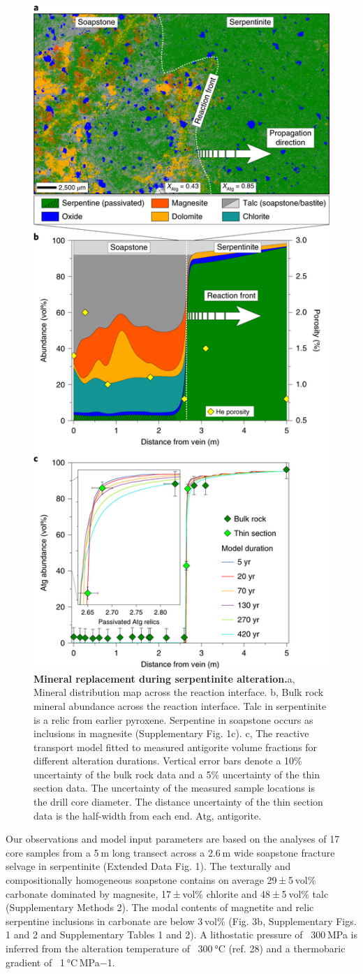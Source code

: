 \begin{figure}[ht]
	\centering
	\includegraphics[width=0.5\linewidth]{figures/fig3.png}
	\caption{\textbf{Mineral replacement during serpentinite alteration.}a, Mineral distribution map across the reaction interface. b, Bulk rock mineral abundance across the reaction interface. Talc in serpentinite is a relic from earlier pyroxene. Serpentine in soapstone occurs as inclusions in magnesite (Supplementary Fig. 1c). c, The reactive transport model fitted to measured antigorite volume fractions for different alteration durations. Vertical error bars denote a 10\% uncertainty of the bulk rock data and a 5\% uncertainty of the thin section data. The uncertainty of the measured sample locations is the drill core diameter. The distance uncertainty of the thin section data is the half-width from each end. Atg, antigorite.}
	\label{fig:fig3}
\end{figure}

Our observations and model input parameters are based on the analyses of 17 core samples from a 5 m long transect across a 2.6 m wide soapstone fracture selvage in serpentinite (Extended Data Fig. 1). The texturally and compositionally homogeneous soapstone contains on average 29 ± 5 vol\% carbonate dominated by magnesite, 17 ± vol\% chlorite and 48 ± 5 vol\% talc (Supplementary Methods 2). The modal contents of magnetite and relic serpentine inclusions in carbonate are below 3 vol\% (Fig. 3b, Supplementary Figs. 1 and 2 and Supplementary Tables 1 and 2). A lithostatic pressure of ~300 MPa is inferred from the alteration temperature of ~300 °C (ref. 28) and a thermobaric gradient of ~1 °C MPa−1.

